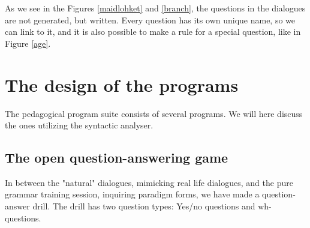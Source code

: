 \documentclass[11pt]{article}
\begin{document}
As we see in the Figures \ref{maidlohket} and \ref{branch}, the questions in the dialogues are not generated, but written. Every question has its own unique name, so we can link to it, and it is also possible to make a rule for a special question, like in Figure \ref{age}.  


\section{The design of the programs}
The pedagogical program suite consists of several programs. We will here discuss the ones utilizing the syntactic analyser.






\subsection{The open question-answering game}	

In between the "natural" dialogues, mimicking real life dialogues, and the pure grammar training session, inquiring paradigm forms, we have made 
a question-answer drill. The drill has two question types: Yes/no questions and wh-questions. 
\end{document}
